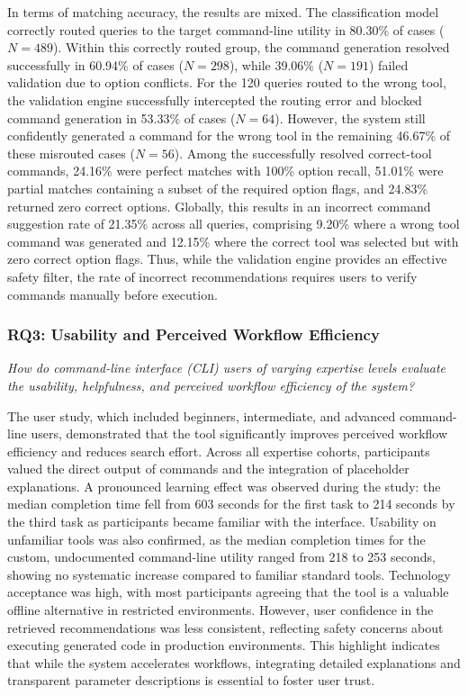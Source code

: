 In terms of matching accuracy, the results are mixed. The classification model correctly routed queries to the target command-line utility in 80.30\% of cases ($N=489$). Within this correctly routed group, the command generation resolved successfully in 60.94\% of cases ($N=298$), while 39.06\% ($N=191$) failed validation due to option conflicts. For the 120 queries routed to the wrong tool, the validation engine successfully intercepted the routing error and blocked command generation in 53.33\% of cases ($N=64$). However, the system still confidently generated a command for the wrong tool in the remaining 46.67\% of these misrouted cases ($N=56$). Among the successfully resolved correct-tool commands, 24.16\% were perfect matches with 100\% option recall, 51.01\% were partial matches containing a subset of the required option flags, and 24.83\% returned zero correct options. Globally, this results in an incorrect command suggestion rate of 21.35\% across all queries, comprising 9.20\% where a wrong tool command was generated and 12.15\% where the correct tool was selected but with zero correct option flags. Thus, while the validation engine provides an effective safety filter, the rate of incorrect recommendations requires users to verify commands manually before execution.

\subsubsection{RQ3: Usability and Perceived Workflow Efficiency}

\textit{How do command-line interface (CLI) users of varying expertise levels evaluate the usability, helpfulness, and perceived workflow efficiency of the system?}

The user study, which included beginners, intermediate, and advanced command-line users, demonstrated that the tool significantly improves perceived workflow efficiency and reduces search effort. Across all expertise cohorts, participants valued the direct output of commands and the integration of placeholder explanations. A pronounced learning effect was observed during the study: the median completion time fell from 603 seconds for the first task to 214 seconds by the third task as participants became familiar with the interface. Usability on unfamiliar tools was also confirmed, as the median completion times for the custom, undocumented command-line utility ranged from 218 to 253 seconds, showing no systematic increase compared to familiar standard tools. Technology acceptance was high, with most participants agreeing that the tool is a valuable offline alternative in restricted environments. However, user confidence in the retrieved recommendations was less consistent, reflecting safety concerns about executing generated code in production environments. This highlight indicates that while the system accelerates workflows, integrating detailed explanations and transparent parameter descriptions is essential to foster user trust.
